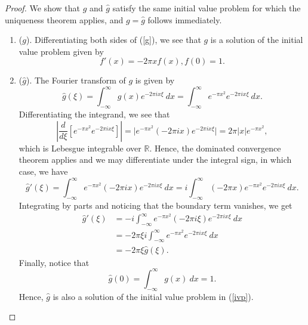 \documentclass[12pt, letterpaper]{article}
\theoremstyle{plain}
\begin{document}
\begin{proof}
    We show that $g$ and $\hat{g}$ satisfy the same initial value problem for which the uniqueness theorem applies, and $g = \hat{g}$ follows immediately.
    \begin{enumerate}
        \item ($g$). Differentiating both sides of (\ref{g}), we see that $g$ is a solution of the initial value problem given by
        \begin{equation}\label{ivp}
            f'(x) = -2\pi x f(x), f(0) = 1.
        \end{equation}
        \item ($\hat{g}$). The Fourier transform of $g$ is given by
        \begin{equation}
            \hat{g}(\xi) = \int_{-\infty}^\infty g(x) e^{-2\pi ix\xi} \ dx = \int_{-\infty}^\infty e^{-\pi x^2} e^{-2\pi ix\xi} \ dx.
        \end{equation}
        Differentiating the integrand, we see that
        \begin{equation}
            \left \vert \frac{d}{d\xi} [e^{-\pi x^2} e^{-2\pi ix\xi}] \right \vert = \vert e^{-\pi x^2} (-2\pi ix) e^{-2\pi ix\xi} \vert = 2\pi \vert x \vert e^{-\pi x^2},
        \end{equation}
         which is Lebesgue integrable over $\mathbb{R}$. Hence, the dominated convergence theorem applies and we may differentiate under the integral sign, in which case, we have
         \begin{equation}
             \hat{g}'(\xi) = \int_{-\infty}^\infty e^{-\pi x^2} (-2\pi ix) e^{-2\pi ix\xi} \ dx = i \int_{-\infty}^\infty (-2\pi x)e^{-\pi x^2} e^{-2\pi ix\xi} \ dx.
         \end{equation}
         Integrating by parts and noticing that the boundary term vanishes, we get 
         \begin{align}
             \hat{g}'(\xi) & = -i \int_{-\infty}^\infty e^{-\pi x^2} (-2\pi i\xi) e^{-2\pi ix\xi} \ dx \\
             & = -2\pi\xi i \int_{-\infty}^\infty e^{-\pi x^2} e^{-2\pi ix\xi} \ dx \\
             & = -2\pi\xi \hat{g}(\xi).
         \end{align}
         Finally, notice that 
         \begin{equation}
             \hat{g}(0) = \int_{-\infty}^\infty g(x) \ dx = 1.
         \end{equation}
         Hence, $\hat{g}$ is also a solution of the initial value problem in (\ref{ivp}).
    \end{enumerate}
\end{proof}
\end{document}
